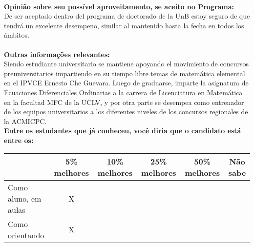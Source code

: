 \documentclass[11pt]{article}
\begin{document}
\\
\textbf{Opinião sobre seu possível aproveitamento, se aceito no Programa:}
\\De ser aceptado dentro del programa de doctorado de la UnB estoy seguro de que tendrá un excelente desempeno, similar al mantenido hasta la fecha en todos los ámbitos.\\ 
\\
\textbf{Outras informações relevantes:} \\Siendo estudiante universitario se mantiene apoyando el movimiento de concursos preuniversitarios impartiendo en su tiempo libre temas de matemática elemental en el IPVCE Ernesto Che Guevara.
Luego de graduarse, imparte la asignatura de Ecuaciones Diferenciales Ordinarias a la carrera de Licenciatura en Matemática en la facultad MFC de la UCLV, y por otra parte se desempea como entrenador de los equipos universitarios a los diferentes niveles de los concursos regionales de la  ACMICPC.
\\[0.3cm]
\textbf{Entre os estudantes que já conheceu, você diria que o candidato está entre os:}
\\
\begin{tabular}{|l|c|c|c|c|c|}
\hline
 & 5\% melhores & 10\% melhores & 25\% melhores & 50\% melhores & Não sabe \\
\hline
Como aluno, em aulas & X &  &  &  & \\
\hline
Como orientando & X &  &  &  & \\
\hline
\end{tabular}
\end{document}

